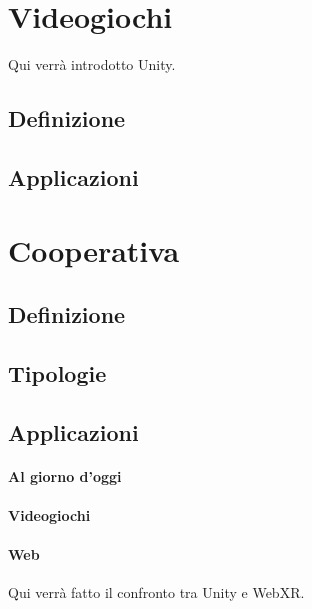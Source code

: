 \section{Videogiochi}\label{sec:Videogiochi}
Qui verrà introdotto Unity.
    \subsection{Definizione}\label{subsec:VideogiochiDef}
    \subsection{Applicazioni}\label{subsec:VideogiochiTipologie}

\section{Cooperativa}\label{sec:Coop}
    \subsection{Definizione}\label{subsec:CoopDef}
    \subsection{Tipologie}\label{subsec:CoopTipologie}
    \subsection{Applicazioni}\label{subsec:CoopApplicazioni}
        \paragraph{Al giorno d'oggi}\label{par:CoopOggi}
        \paragraph{Videogiochi}\label{par:CoopVideogiochi}
        \paragraph{Web}\label{par:CoopWeb}
        Qui verrà fatto il confronto tra Unity e WebXR.
